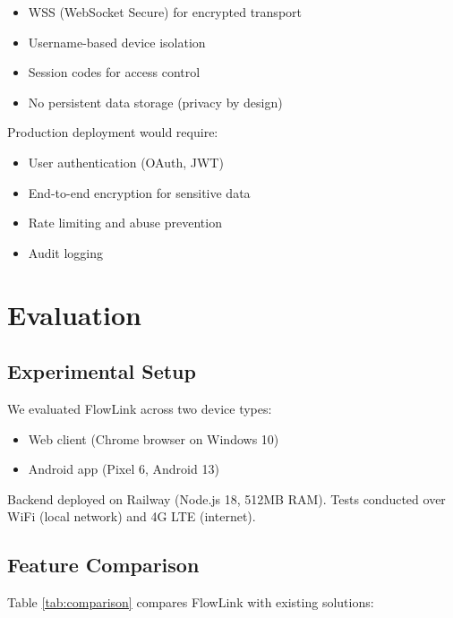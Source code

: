 \documentclass[conference]{IEEEtran}
\begin{document}
\begin{itemize}
    \item WSS (WebSocket Secure) for encrypted transport
    \item Username-based device isolation
    \item Session codes for access control
    \item No persistent data storage (privacy by design)
\end{itemize}

Production deployment would require:
\begin{itemize}
    \item User authentication (OAuth, JWT)
    \item End-to-end encryption for sensitive data
    \item Rate limiting and abuse prevention
    \item Audit logging
\end{itemize}

\section{Evaluation}

\subsection{Experimental Setup}

We evaluated FlowLink across two device types:
\begin{itemize}
    \item Web client (Chrome browser on Windows 10)
    \item Android app (Pixel 6, Android 13)
\end{itemize}

Backend deployed on Railway (Node.js 18, 512MB RAM). Tests conducted over WiFi (local network) and 4G LTE (internet).

\subsection{Feature Comparison}

Table \ref{tab:comparison} compares FlowLink with existing solutions:
\end{document}
